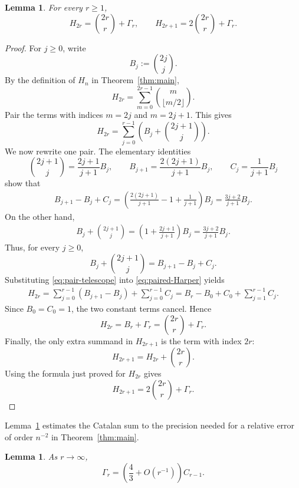 \documentclass[10pt]{amsart}
\newtheorem{lemma}[theorem]{Lemma}
\numberwithin{equation}{section}
\begin{document}
\begin{lemma}\label{lem:Catalan-decomposition}
For every $r\ge1$,
\begin{equation}\label{eq:Catalan-decomposition}
 H_{2r}=\binom{2r}{r}+\Gamma_r,
 \qquad
 H_{2r+1}=2\binom{2r}{r}+\Gamma_r.
\end{equation}
\end{lemma}

\begin{proof}
For $j\ge0$, write
\[
 B_j:=\binom{2j}{j}.
\]
By the definition of $H_n$ in Theorem~\ref{thm:main},
\[
 H_{2r}=\sum_{m=0}^{2r-1}\binom{m}{\lfloor m/2\rfloor}.
\]
Pair the terms with indices $m=2j$ and $m=2j+1$.  This gives
\begin{equation}\label{eq:paired-Harper}
 H_{2r}=\sum_{j=0}^{r-1}
 \left(B_j+\binom{2j+1}{j}\right).
\end{equation}
We now rewrite one pair.  The elementary identities
\[
 \binom{2j+1}{j}=\frac{2j+1}{j+1}B_j,
 \qquad
 B_{j+1}=\frac{2(2j+1)}{j+1}B_j,
 \qquad
 C_j=\frac{1}{j+1}B_j
\]
show that
\begin{align*}
 B_{j+1}-B_j+C_j
 =\left(\frac{2(2j+1)}{j+1}-1+\frac{1}{j+1}\right)B_j
 =\frac{3j+2}{j+1}B_j.
\end{align*}
On the other hand,
\begin{align*}
 B_j+\binom{2j+1}{j}
 =\left(1+\frac{2j+1}{j+1}\right)B_j
 =\frac{3j+2}{j+1}B_j.
\end{align*}
Thus, for every $j\ge0$,
\begin{equation}\label{eq:pair-telescope}
 B_j+\binom{2j+1}{j}=B_{j+1}-B_j+C_j.
\end{equation}
Substituting \cref{eq:pair-telescope} into \cref{eq:paired-Harper} yields
\begin{align*}
 H_{2r}
 =\sum_{j=0}^{r-1}(B_{j+1}-B_j)
   +\sum_{j=0}^{r-1}C_j
 =B_r-B_0+C_0+\sum_{j=1}^{r-1}C_j.
\end{align*}
Since $B_0=C_0=1$, the two constant terms cancel.  Hence
\[
 H_{2r}=B_r+\Gamma_r
       =\binom{2r}{r}+\Gamma_r.
\]
Finally, the only extra summand in $H_{2r+1}$ is the term with index $2r$:
\[
 H_{2r+1}=H_{2r}+\binom{2r}{r}.
\]
Using the formula just proved for $H_{2r}$ gives
\[
 H_{2r+1}=2\binom{2r}{r}+\Gamma_r.
\]
\end{proof}

Lemma~\ref{lem:Catalan-tail} estimates the Catalan sum to the precision needed for
a relative error of order $n^{-2}$ in Theorem~\ref{thm:main}.

\begin{lemma}\label{lem:Catalan-tail}
As $r\to\infty$,
\begin{equation}\label{eq:Catalan-tail}
 \Gamma_r=\left(\frac43+O(r^{-1})\right)C_{r-1}.
\end{equation}
\end{lemma}
\end{document}
